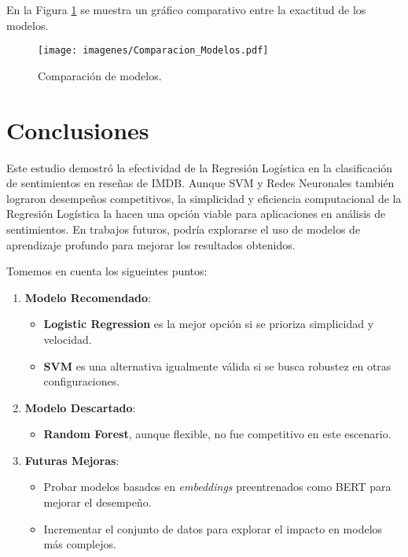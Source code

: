 \documentclass[conference]{IEEEtran}
\begin{document}
En la Figura \ref{fig:comparacion} se muestra un gráfico comparativo entre la exactitud de los modelos.

\begin{figure}[h]
    \centering
    \texttt{[image: imagenes/Comparacion\_Modelos.pdf]}
    \caption{Comparación de modelos.}
    \label{fig:comparacion}
\end{figure}

\FloatBarrier


\section{Conclusiones}

Este estudio demostró la efectividad de la Regresión Logística en la clasificación de sentimientos en reseñas de IMDB. Aunque SVM y Redes Neuronales también lograron desempeños competitivos, la simplicidad y eficiencia computacional de la Regresión Logística la hacen una opción viable para aplicaciones en análisis de sentimientos. En trabajos futuros, podría explorarse el uso de modelos de aprendizaje profundo para mejorar los resultados obtenidos.

Tomemos en cuenta los sigueintes puntos:

\begin{enumerate}
    \item \textbf{Modelo Recomendado}:
    \begin{itemize}
        \item \textbf{Logistic Regression} es la mejor opción si se prioriza simplicidad y velocidad.
        \item \textbf{SVM} es una alternativa igualmente válida si se busca robustez en otras configuraciones.
    \end{itemize}
    
    \item \textbf{Modelo Descartado}:
    \begin{itemize}
        \item \textbf{Random Forest}, aunque flexible, no fue competitivo en este escenario.
    \end{itemize}
    
    \item \textbf{Futuras Mejoras}:
    \begin{itemize}
        \item Probar modelos basados en \textit{embeddings} preentrenados como BERT para mejorar el desempeño.
        \item Incrementar el conjunto de datos para explorar el impacto en modelos más complejos.
    \end{itemize}
\end{enumerate}
\end{document}
